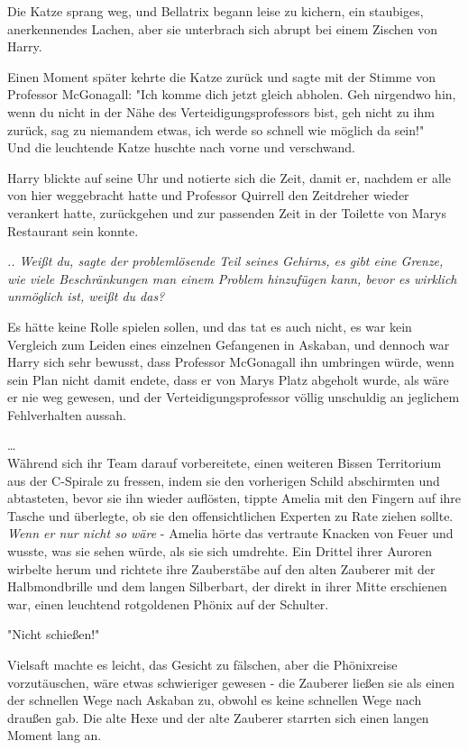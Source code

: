 {Die Katze sprang weg, und Bellatrix begann leise zu kichern, ein staubiges, anerkennendes Lachen, aber sie unterbrach sich abrupt bei einem Zischen von Harry.

Einen Moment später kehrte die Katze zurück und sagte mit der Stimme von Professor McGonagall: "Ich komme dich jetzt gleich abholen. Geh nirgendwo hin, wenn du nicht in der Nähe des Verteidigungsprofessors bist, geh nicht zu ihm zurück, sag zu niemandem etwas, ich werde so schnell wie möglich da sein!"\\ Und die leuchtende Katze huschte nach vorne und verschwand.

Harry blickte auf seine Uhr und notierte sich die Zeit, damit er, nachdem er alle von hier weggebracht hatte und Professor Quirrell den Zeitdreher wieder verankert hatte, zurückgehen und zur passenden Zeit in der Toilette von Marys Restaurant sein konnte.

\emph{.. Weißt du, sagte der problemlösende Teil seines Gehirns, es gibt eine Grenze, wie viele Beschränkungen man einem Problem hinzufügen kann, bevor es wirklich unmöglich ist, weißt du das?}

Es hätte keine Rolle spielen sollen, und das tat es auch nicht, es war kein Vergleich zum Leiden eines einzelnen Gefangenen in Askaban, und dennoch war Harry sich sehr bewusst, dass Professor McGonagall ihn umbringen würde, wenn sein Plan nicht damit endete, dass er von Marys Platz abgeholt wurde, als wäre er nie weg gewesen, und der Verteidigungsprofessor völlig unschuldig an jeglichem Fehlverhalten aussah.

…\\ Während sich ihr Team darauf vorbereitete, einen weiteren Bissen Territorium aus der C-Spirale zu fressen, indem sie den vorherigen Schild abschirmten und abtasteten, bevor sie ihn wieder auflösten, tippte Amelia mit den Fingern auf ihre Tasche und überlegte, ob sie den offensichtlichen Experten zu Rate ziehen sollte. \emph{Wenn er nur nicht so wäre} - Amelia hörte das vertraute Knacken von Feuer und wusste, was sie sehen würde, als sie sich umdrehte. Ein Drittel ihrer Auroren wirbelte herum und richtete ihre Zauberstäbe auf den alten Zauberer mit der Halbmondbrille und dem langen Silberbart, der direkt in ihrer Mitte erschienen war, einen leuchtend rotgoldenen Phönix auf der Schulter.

"Nicht schießen!"

Vielsaft machte es leicht, das Gesicht zu fälschen, aber die Phönixreise vorzutäuschen, wäre etwas schwieriger gewesen - die Zauberer ließen sie als einen der schnellen Wege nach Askaban zu, obwohl es keine schnellen Wege nach draußen gab. Die alte Hexe und der alte Zauberer starrten sich einen langen Moment lang an.

}

